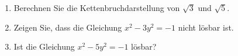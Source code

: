 
\begin{exercise}

\begin{enumerate}[label = (\alph*)]
    \item Berechnen Sie die Kettenbruchdarstellung von $\sqrt{3}$ und $\sqrt{5}$.
    \item Zeigen Sie, dass die Gleichung $x^2 - 3y^2 = -1$ nicht lösbar ist.
    \item Ist die Gleichung $x^2 - 5y^2 = -1$ lösbar?
\end{enumerate}

\end{exercise}


\begin{solution}

\phantom{}

\end{solution}

